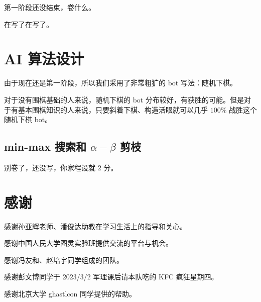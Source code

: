 \documentclass{noithesis}
\begin{document}
	第一阶段还没结束，卷什么。
	
	在写了在写了。
	
	\section{AI 算法设计}
	
	由于现在还是第一阶段，所以我们采用了非常粗犷的 bot 写法：随机下棋。
	
	对于没有围棋基础的人来说，随机下棋的 bot 分布较好，有获胜的可能。但是对于有基本围棋知识的人来说，只要斜着下棋、构造活眼就可以几乎 $100\%$ 战胜这个随机下棋 bot。
	
	\subsection{min-max 搜索和 $\alpha-\beta$ 剪枝}
	
	别卷了，还没写，你家程设就 $2$ 分。
	
	\section{感谢}
	
	感谢孙亚辉老师、潘俊达助教在学习生活上的指导和关心。
	
	感谢中国人民大学图灵实验班提供交流的平台与机会。
	
	感谢冯友和、赵培宇同学组成的团队。
	
	感谢彭文博同学于 2023/3/2 军理课后请本队吃的 KFC 疯狂星期四。
	
	感谢北京大学 ghastlcon 同学提供的帮助。
	
\end{document}
